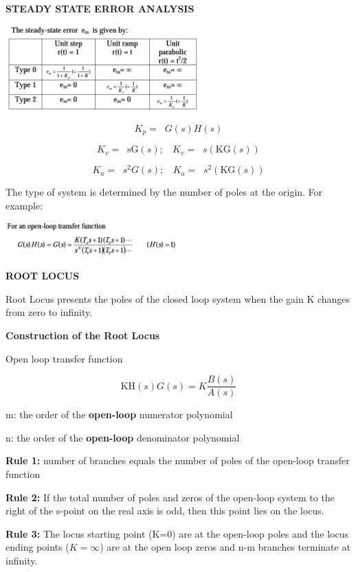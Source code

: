 \documentclass[a0,landscape]{article}
\begin{document}
\begin{multicols}{3}
\textbf{STEADY STATE ERROR ANALYSIS}

\includegraphics[width=2.94019in,height=1.30675in]{media/image15.png} 
\hfill \break

\[K_{p} = \operatorname{}{G\left( s \right)H(s)}\]

\[K_{v} = \operatorname{}{\text{sG}\left( s \right);\ \ \ \ K_{v} = \operatorname{}{s\left( \text{KG}\left( s \right) \right)}}\]

\[K_{a} = \operatorname{}{s^{2}G\left( s \right);\ \ \ \ K_{a} = \operatorname{}{s^{2}\left( \text{KG}\left( s \right) \right)}}\]

The type of system is determined by the number of poles at the origin.
For example:

\includegraphics[width=2.60736in,height=0.52328in]{media/image16.png}

\textbf{ROOT LOCUS}

Root Locus presents the poles of the closed loop system when the gain K
changes from zero to infinity.

\textbf{Construction of the Root Locus}

Open loop transfer function

\[\text{KH}\left( s \right)G\left( s \right) = K\frac{B(s)}{A(s)}\]

m: the order of the \textbf{open-loop} numerator polynomial

n: the order of the \textbf{open-loop} denominator polynomial

\textbf{Rule 1:} number of branches equals the number of poles of the
open-loop transfer function

\textbf{Rule 2:} If the total number of poles and zeros of the open-loop
system to the right of the s-point on the real axis is odd, then this
point lies on the locus.

\textbf{Rule 3:} The locus starting point (K=0) are at the open-loop
poles and the locus ending points ($K=\infty$) are at the open loop zeros and
n-m branches terminate at infinity.


\end{multicols}
\end{document}
